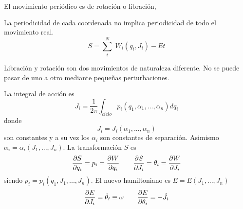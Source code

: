 \documentclass[10pt,oneside]{CBFT_book}
\begin{document}
El movimiento periódico es de rotación o libración,

La periodicidad de cada coordenada no implica periodicidad de todo el movimiento real.
\[
	S = \sum_i^N \; W_i(q_i,J_i) - Et
\]

Libración y rotación son dos movimientos de naturaleza diferente. No se puede pasar de
uno a otro mediante pequeñas perturbaciones.

La integral de acción es
\[
	J_i = \frac{1}{2\pi}\int_{ciclo} p_i(q_1,\alpha_1,...,\alpha_n) dq_i
\]
donde 
\[
	J_i = J_i(\alpha_1,...,\alpha_n)
\]
son constantes y a su vez los $\alpha_i$ son constantes de separación.
Asimismo $\alpha_i=\alpha_i(J_1,...,J_n)$. 
La transformación $S$ es 
\[
	\frac{\partial^{\hspace{-0.05em}} {S}}{\partial {q_i}^{\hspace{-0.05em}}} = p_i = \frac{\partial^{\hspace{-0.05em}} {W}}{\partial {q_i}^{\hspace{-0.05em}}} \qquad \frac{\partial^{\hspace{-0.05em}} {S}}{\partial {J_i}^{\hspace{-0.05em}}} = \theta_i = \frac{\partial^{\hspace{-0.05em}} {W}}{\partial {J_i}^{\hspace{-0.05em}}}
\]
siendo $p_i = p_i(q_1,J_1,...,J_n)$.
El nuevo hamiltoniano es $E=E(J_1,...,J_n)$
\[
	\frac{\partial^{\hspace{-0.05em}} {E}}{\partial {J_i}^{\hspace{-0.05em}}} = \dot{\theta}_i \equiv \omega \qquad \frac{\partial^{\hspace{-0.05em}} {E}}{\partial {\theta_i}^{\hspace{-0.05em}}} = -\dot{J}_i
\]






























\end{document}
